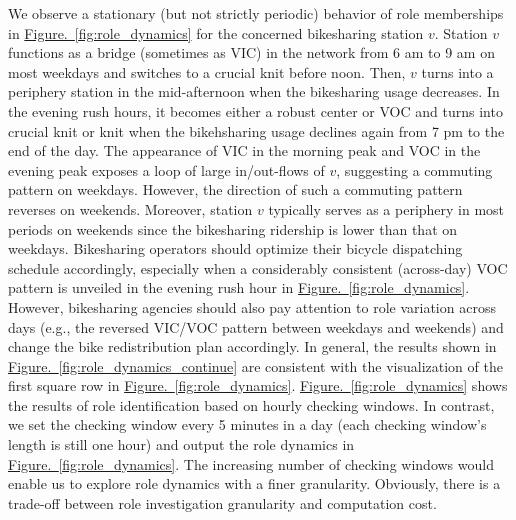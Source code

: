 \documentclass[a4paper,fleqn]{cas-sc}
\begin{document}
{We observe a stationary (but not strictly periodic) behavior of role memberships in \hyperref[fig:role_dynamics]{Figure.~\ref{fig:role_dynamics}} for the concerned bikesharing station $v$. Station $v$ functions as a bridge (sometimes as VIC) in the network from 6 am to 9 am on most weekdays and switches to a crucial knit before noon. Then, $v$ turns into a periphery station in the mid-afternoon when the bikesharing usage decreases.  In the evening rush hours, it becomes either a robust center or VOC and turns into crucial knit or knit when the bikehsharing usage declines again from 7 pm to the end of the day. The appearance of VIC in the morning peak and VOC in the evening peak exposes a loop of large in/out-flows of $v$, suggesting a commuting pattern on weekdays. However, the direction of such a commuting pattern reverses on weekends. Moreover, station $v$ typically serves as a periphery in most periods on weekends since the bikesharing ridership is lower than that on weekdays. Bikesharing operators should optimize their bicycle dispatching schedule accordingly, especially when a considerably consistent (across-day) VOC pattern is unveiled in the evening rush hour in \hyperref[fig:role_dynamics]{Figure.~\ref{fig:role_dynamics}}. However, bikesharing agencies should also pay attention to role variation across days (e.g., the reversed VIC/VOC pattern between weekdays and weekends) and change the bike redistribution plan accordingly. In general, the results shown in \hyperref[fig:role_dynamics_continue]{Figure.~\ref{fig:role_dynamics_continue}} are consistent with the visualization of the first square row in \hyperref[fig:role_dynamics]{Figure.~\ref{fig:role_dynamics}}. \hyperref[fig:role_dynamics]{Figure.~\ref{fig:role_dynamics}} shows the results of role identification based on hourly checking windows. In contrast, we set the checking window every 5 minutes in a day (each checking window's length is still one hour) and output the role dynamics in \hyperref[fig:role_dynamics]{Figure.~\ref{fig:role_dynamics}}. The increasing number of checking windows would enable us to explore role dynamics with a finer granularity. Obviously, there is a trade-off between role investigation granularity and computation cost.

}
\end{document}
